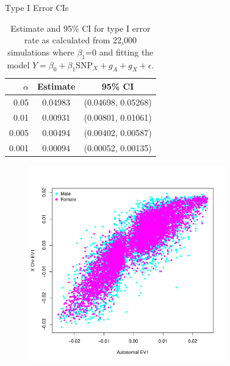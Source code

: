 \documentclass{beamer}
\begin{document}
\begin{frame}{Type I Error CIs}
\begin{table}[ht]
\centering
\begin{tabular}{r|cc}
  \hline
  $\alpha$ & Estimate & 95\% CI \\ 
  \hline
 0.05 & 0.04983 & (0.04698, 0.05268) \\ 
0.01 & 0.00931 & (0.00801, 0.01061) \\ 
0.005 & 0.00494 & (0.00402, 0.00587) \\ 
 0.001 & 0.00094 & (0.00052, 0.00135) \\ 
   \hline
\end{tabular}
\caption{Estimate and 95\% CI for type I error rate as calculated from 22,000 simulations where $\beta_1$=0 and fitting the model $Y = \beta_0 + \beta_1 \mbox{SNP}_X + g_A + g_X + \epsilon$.}
\end{table}
\end{frame}

\begin{frame}
\centering
\begin{figure}
\includegraphics[height=8.5cm]{../pca_x_auto_ev1_sexCol.pdf}
\end{figure}
\end{frame}
\end{document}

